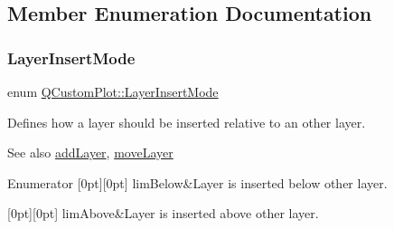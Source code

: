 \subsection{Member Enumeration Documentation}
\hypertarget{class_q_custom_plot_a75a8afbe6ef333b1f3d47abb25b9add7}{}\label{class_q_custom_plot_a75a8afbe6ef333b1f3d47abb25b9add7} 
\subsubsection{\texorpdfstring{Layer\+Insert\+Mode}{LayerInsertMode}}
{\footnotesize\ttfamily enum \hyperlink{class_q_custom_plot_a75a8afbe6ef333b1f3d47abb25b9add7}{Q\+Custom\+Plot\+::\+Layer\+Insert\+Mode}}

Defines how a layer should be inserted relative to an other layer.

\begin{DoxySeeAlso}{See also}
\hyperlink{class_q_custom_plot_ad5255393df078448bb6ac83fa5db5f52}{add\+Layer}, \hyperlink{class_q_custom_plot_ae896140beff19424e9e9e02d6e331104}{move\+Layer} 
\end{DoxySeeAlso}
\begin{DoxyEnumFields}{Enumerator}
[0pt][0pt]{}\hypertarget{class_q_custom_plot_a75a8afbe6ef333b1f3d47abb25b9add7aee39cf650cd24e68552da0b697ce4a93}{}\label{class_q_custom_plot_a75a8afbe6ef333b1f3d47abb25b9add7aee39cf650cd24e68552da0b697ce4a93} 
lim\+Below&Layer is inserted below other layer. \\
\hline

[0pt][0pt]{}\hypertarget{class_q_custom_plot_a75a8afbe6ef333b1f3d47abb25b9add7a062b0b7825650b432a713c0df6742d41}{}\label{class_q_custom_plot_a75a8afbe6ef333b1f3d47abb25b9add7a062b0b7825650b432a713c0df6742d41} 
lim\+Above&Layer is inserted above other layer. \\
\hline

\end{DoxyEnumFields}
\hypertarget{class_q_custom_plot_a45d61392d13042e712a956d27762aa39}{}\label{class_q_custom_plot_a45d61392d13042e712a956d27762aa39} 
